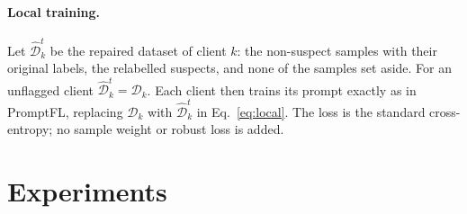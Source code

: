 \documentclass[runningheads]{llncs}
\begin{document}
\paragraph{Local training.}
Let $\hat{\mathcal{D}}^{t}_k$ be the repaired dataset of client $k$: the non-suspect samples
with their original labels, the relabelled suspects, and none of the samples set aside.
For an unflagged client $\hat{\mathcal{D}}^{t}_k = \mathcal{D}_k$. Each client then trains its
prompt exactly as in PromptFL, replacing $\mathcal{D}_k$ with $\hat{\mathcal{D}}^{t}_k$ in
Eq.~\eqref{eq:local}. The loss is the standard cross-entropy; no sample weight or robust loss is
added.


\section{Experiments}
\label{sec:exp}
\end{document}
